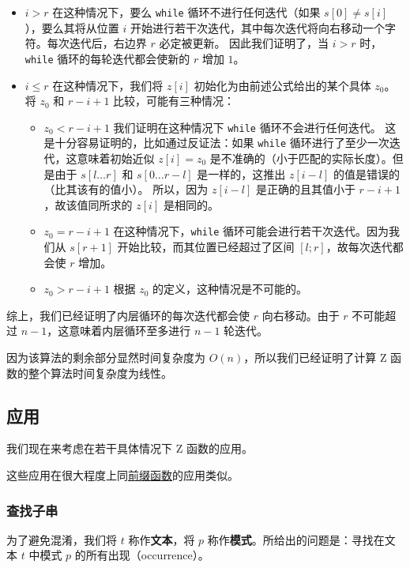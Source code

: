 \begin{itemize}
\item $i > r$
在这种情况下，要么 \texttt{while} 循环不进行任何迭代（如果 $s[0] \neq s[i]$），要么其将从位置 $i$ 开始进行若干次迭代，其中每次迭代将向右移动一个字符。每次迭代后，右边界 $r$ 必定被更新。
因此我们证明了，当 $i > r$ 时，\texttt{while} 循环的每轮迭代都会使新的 $r$ 增加 $1$。
\item $i \le r$
在这种情况下，我们将 $z[i]$ 初始化为由前述公式给出的某个具体 $z_0$。将 $z_0$ 和 $r - i + 1$ 比较，可能有三种情况：
\begin{itemize}
\item $z_0 < r - i + 1$
我们证明在这种情况下 \texttt{while} 循环不会进行任何迭代。
这是十分容易证明的，比如通过反证法：如果 \texttt{while} 循环进行了至少一次迭代，这意味着初始近似 $z[i] = z_0$ 是不准确的（小于匹配的实际长度）。但是由于 $s[l\dots r]$ 和 $s[0\dots r - l]$ 是一样的，这推出 $z[i - l]$ 的值是错误的（比其该有的值小）。
所以，因为 $z[i - l]$ 是正确的且其值小于 $r - i + 1$，故该值同所求的 $z[i]$ 是相同的。
\item $z_0 = r - i + 1$
在这种情况下，\texttt{while} 循环可能会进行若干次迭代。因为我们从 $s[r + 1]$ 开始比较，而其位置已经超过了区间 $[l;r]$，故每次迭代都会使 $r$ 增加。
\item $z_0 > r - i + 1$
根据 $z_0$ 的定义，这种情况是不可能的。
\end{itemize}
\end{itemize}

综上，我们已经证明了内层循环的每次迭代都会使 $r$ 向右移动。由于 $r$ 不可能超过 $n - 1$，这意味着内层循环至多进行 $n - 1$ 轮迭代。

因为该算法的剩余部分显然时间复杂度为 $O(n)$，所以我们已经证明了计算 Z 函数的整个算法时间复杂度为线性。

\subsection{应用}

我们现在来考虑在若干具体情况下 Z 函数的应用。

这些应用在很大程度上同\href{./prefix-function.md}{前缀函数}的应用类似。

\subsubsection{查找子串}

为了避免混淆，我们将 $t$ 称作\textbf{文本}，将 $p$ 称作\textbf{模式}。所给出的问题是：寻找在文本 $t$ 中模式 $p$ 的所有出现（occurrence）。


